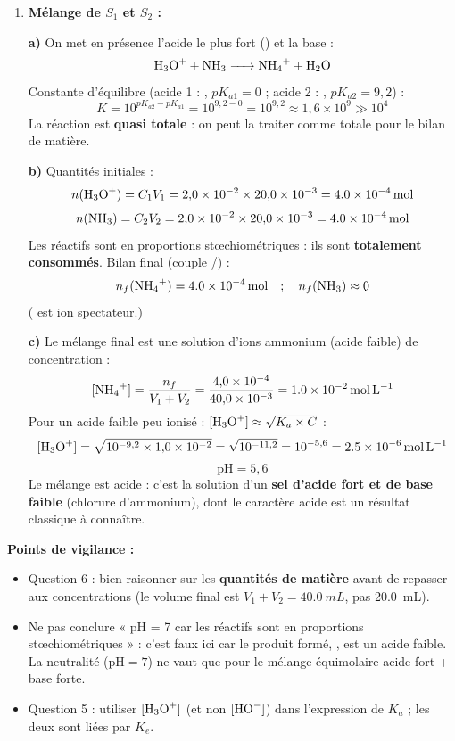 \documentclass[11pt]{article}
\begin{document}
\begin{corrige}
\begin{enumerate}
\item \textbf{Mélange de $S_1$ et $S_2$ :}

\textbf{a)} On met en présence l'acide le plus fort () et la base  :
\[ \ce{H3O+ + NH3 -> NH4+ + H2O} \]
Constante d'équilibre (acide 1 : , $pK_{a1} = 0$ ; acide 2 : , $pK_{a2} = 9{,}2$) :
\[ K = 10^{pK_{a2} - pK_{a1}} = 10^{9{,}2 - 0} = 10^{9{,}2} \approx 1{,}6\times10^{9} \gg 10^{4} \]
La réaction est \textbf{quasi totale} : on peut la traiter comme totale pour le bilan de matière.

\textbf{b)} Quantités initiales :
\[ n(\ce{H3O+}) = C_1 V_1 = 2{,}0\times10^{-2} \times 20{,}0\times10^{-3} = \SI{4,0e-4}{mol} \]
\[ n(\ce{NH3}) = C_2 V_2 = 2{,}0\times10^{-2} \times 20{,}0\times10^{-3} = \SI{4,0e-4}{mol} \]
Les réactifs sont en proportions stœchiométriques : ils sont \textbf{totalement consommés}. Bilan final (couple /) :
\[ n_f(\ce{NH4+}) = \SI{4,0e-4}{mol} \quad ; \quad n_f(\ce{NH3}) \approx 0 \]
( est ion spectateur.)

\textbf{c)} Le mélange final est une solution d'ions ammonium  (acide faible) de concentration :
\[ [\ce{NH4+}] = \frac{n_f}{V_1 + V_2} = \frac{4{,}0\times10^{-4}}{40{,}0\times10^{-3}} = \SI{1,0e-2}{mol.L^{-1}} \]
Pour un acide faible peu ionisé : $[\ce{H3O+}] \approx \sqrt{K_a \times C}$ :
\[ [\ce{H3O+}] = \sqrt{10^{-9{,}2} \times 1{,}0\times10^{-2}} = \sqrt{10^{-11{,}2}} = 10^{-5{,}6} = \SI{2,5e-6}{mol.L^{-1}} \]
\[ \boxed{\mathrm{pH} = 5{,}6} \]
Le mélange est acide : c'est la solution d'un \textbf{sel d'acide fort et de base faible} (chlorure d'ammonium), dont le caractère acide est un résultat classique à connaître.
\end{enumerate}

\textbf{Points de vigilance :}
\begin{itemize}
\item Question 6 : bien raisonner sur les \textbf{quantités de matière} avant de repasser aux concentrations (le volume final est $V_1 + V_2 = \SI{40,0}{mL}$, pas \SI{20,0}{mL}).
\item Ne pas conclure « pH = 7 car les réactifs sont en proportions stœchiométriques » : c'est faux ici car le produit formé, , est un acide faible. La neutralité ($\mathrm{pH} = 7$) ne vaut que pour le mélange équimolaire acide fort + base forte.
\item Question 5 : utiliser $[\ce{H3O+}]$ (et non $[\ce{HO-}]$) dans l'expression de $K_a$ ; les deux sont liées par $K_e$.
\end{itemize}
\end{corrige}
\end{document}
